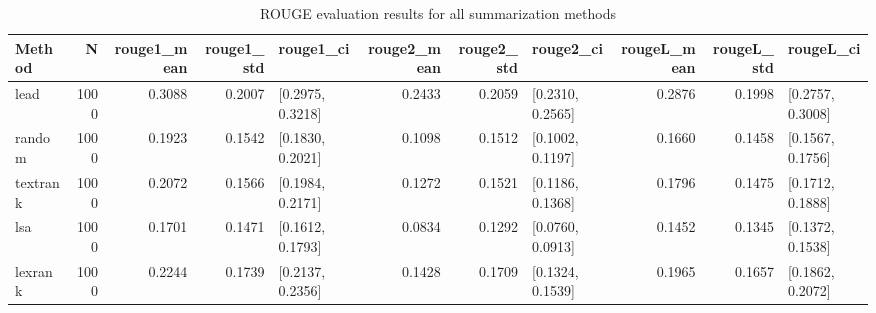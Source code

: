 \begin{table}
\caption{ROUGE evaluation results for all summarization methods}
\label{tab:rouge_results}
\begin{tabular}{lrrrlrrlrrl}
\toprule
Method & N & rouge1_mean & rouge1_std & rouge1_ci & rouge2_mean & rouge2_std & rouge2_ci & rougeL_mean & rougeL_std & rougeL_ci \\
\midrule
lead & 1000 & 0.3088 & 0.2007 & [0.2975, 0.3218] & 0.2433 & 0.2059 & [0.2310, 0.2565] & 0.2876 & 0.1998 & [0.2757, 0.3008] \\
random & 1000 & 0.1923 & 0.1542 & [0.1830, 0.2021] & 0.1098 & 0.1512 & [0.1002, 0.1197] & 0.1660 & 0.1458 & [0.1567, 0.1756] \\
textrank & 1000 & 0.2072 & 0.1566 & [0.1984, 0.2171] & 0.1272 & 0.1521 & [0.1186, 0.1368] & 0.1796 & 0.1475 & [0.1712, 0.1888] \\
lsa & 1000 & 0.1701 & 0.1471 & [0.1612, 0.1793] & 0.0834 & 0.1292 & [0.0760, 0.0913] & 0.1452 & 0.1345 & [0.1372, 0.1538] \\
lexrank & 1000 & 0.2244 & 0.1739 & [0.2137, 0.2356] & 0.1428 & 0.1709 & [0.1324, 0.1539] & 0.1965 & 0.1657 & [0.1862, 0.2072] \\
\bottomrule
\end{tabular}
\end{table}
